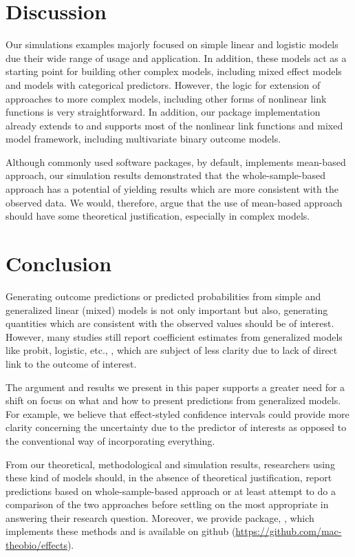 \section{Discussion}

Our simulations examples majorly focused on simple linear and logistic models due their wide range of usage and application. In addition, these models act as a starting point for building other complex models, including mixed effect models and models with categorical predictors. However, the logic for extension of approaches to more complex models, including other forms of nonlinear link functions is very straightforward. In addition, our  package implementation already extends to and supports most of the nonlinear link functions and mixed model framework, including multivariate binary outcome models.

Although commonly used  software packages, by default, implements mean-based approach, our simulation results demonstrated that the whole-sample-based approach has a potential of yielding results which are more consistent with the observed data. We would, therefore, argue that the use of mean-based approach should have some theoretical justification, especially in complex models. 

\section{Conclusion}

Generating outcome predictions or predicted probabilities from simple and generalized linear (mixed) models is not only important but also, generating quantities which are consistent with the observed values should be of interest. However, many studies still report coefficient estimates from generalized models like probit, logistic, etc., \citep{hanmer2013behind}, which are subject of less clarity due to lack of direct link to the outcome of interest.

The argument and results we present in this paper supports a greater need for a shift on focus on what and how to present predictions from generalized models. For example, we believe that effect-styled confidence intervals could provide more clarity concerning the uncertainty due to the predictor of interests as opposed to the conventional way of incorporating everything. 

From our theoretical, methodological and simulation results, researchers using these kind of models should, in the absence of theoretical justification, report predictions based on whole-sample-based approach or at least attempt to do a comparison of the two approaches before settling on the most appropriate in answering their research question. Moreover, we provide  package, , which implements these methods and is available on github (\href{https://github.com/mac-theobio/effects}{https://github.com/mac-theobio/effects}).


